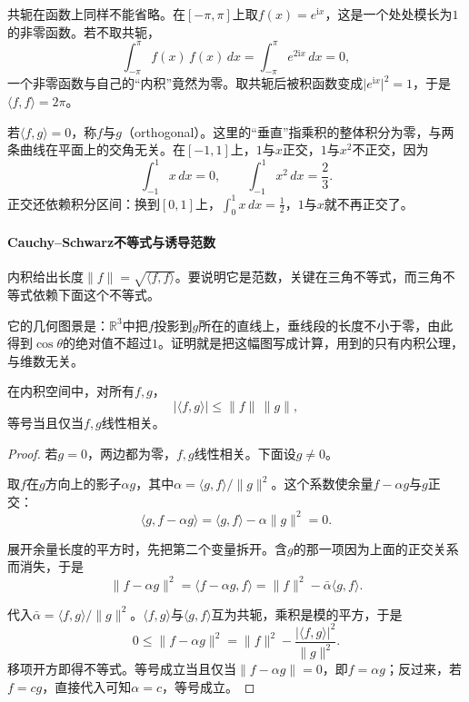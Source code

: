 共轭在函数上同样不能省略。在$[-\pi,\pi]$上取$f(x)=e^{\mathrm ix}$，这是一个处处模长为$1$的非零函数。若不取共轭，
\[
 \int_{-\pi}^{\pi}f(x)\,f(x)\,dx=\int_{-\pi}^{\pi}e^{2\mathrm ix}\,dx=0,
\]
一个非零函数与自己的“内积”竟然为零。取共轭后被积函数变成$\lvert e^{\mathrm ix}\rvert^2=1$，于是$\langle f,f\rangle=2\pi$。

若$\langle f,g\rangle=0$，称$f$与$g$（orthogonal）。这里的“垂直”指乘积的整体积分为零，与两条曲线在平面上的交角无关。在$[-1,1]$上，$1$与$x$正交，$1$与$x^2$不正交，因为
\[
 \int_{-1}^1x\,dx=0,\qquad \int_{-1}^1x^2\,dx=\frac23 .
\]
正交还依赖积分区间：换到$[0,1]$上，$\int_0^1x\,dx=\tfrac12$，$1$与$x$就不再正交了。

\paragraph{Cauchy--Schwarz不等式与诱导范数}
内积给出长度$\lVert f\rVert=\sqrt{\langle f,f\rangle}$。要说明它是范数，关键在三角不等式，而三角不等式依赖下面这个不等式。

它的几何图景是：$\mathbb R^3$中把$f$投影到$g$所在的直线上，垂线段的长度不小于零，由此得到$\cos\theta$的绝对值不超过$1$。证明就是把这幅图写成计算，用到的只有内积公理，与维数无关。

\begin{theorem}
\label{thm:ipspace-cauchy-schwarz}
在内积空间中，对所有$f,g$，
\begin{equation}
 \lvert\langle f,g\rangle\rvert\leq\lVert f\rVert\,\lVert g\rVert ,
 \label{eq:ipspace-cauchy-schwarz}
\end{equation}
等号当且仅当$f,g$线性相关。
\end{theorem}

\begin{proof}
若$g=0$，两边都为零，$f,g$线性相关。下面设$g\neq0$。

取$f$在$g$方向上的影子$\alpha g$，其中$\alpha=\langle g,f\rangle/\lVert g\rVert^2$。这个系数使余量$f-\alpha g$与$g$正交：
\[
 \langle g,f-\alpha g\rangle=\langle g,f\rangle-\alpha\lVert g\rVert^2=0 .
\]

展开余量长度的平方时，先把第二个变量拆开。含$g$的那一项因为上面的正交关系而消失，于是
\[
 \lVert f-\alpha g\rVert^2=\langle f-\alpha g,f\rangle=\lVert f\rVert^2-\bar\alpha\langle g,f\rangle .
\]

代入$\bar\alpha=\langle f,g\rangle/\lVert g\rVert^2$。$\langle f,g\rangle$与$\langle g,f\rangle$互为共轭，乘积是模的平方，于是
\[
 0\leq\lVert f-\alpha g\rVert^2=\lVert f\rVert^2-\frac{\lvert\langle f,g\rangle\rvert^2}{\lVert g\rVert^2}.
\]
移项开方即得不等式。等号成立当且仅当$\lVert f-\alpha g\rVert=0$，即$f=\alpha g$；反过来，若$f=cg$，直接代入可知$\alpha=c$，等号成立。
\end{proof}

